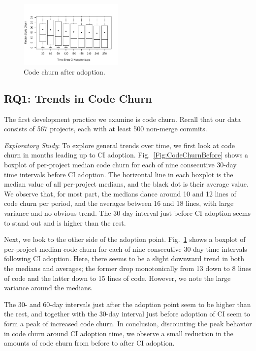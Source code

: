 \begin{figure}[t]
\centering
\includegraphics[width=0.45\textwidth, clip=true, trim=0 15 15 50]{churn_after.pdf}
\caption{Code churn after \Tvis adoption.}
\label{Fig:CodeChurnAfter}\vspace{-0.3cm}
\end{figure}


\subsection{RQ1: Trends in Code Churn}

The first development practice we examine is code churn.
Recall that our data consists of 567 projects, each with at least 500 non-merge 
commits.

\smallskip\noindent \emph{Exploratory Study}: To explore general trends over 
time, we first look at code churn in months leading up to CI adoption.
Fig.~\ref{Fig:CodeChurnBefore} shows a boxplot of per-project median code 
churn for each of nine consecutive 30-day time intervals before CI adoption.
The horizontal line in each boxplot is the median value of all per-project medians, 
and the black dot is their average value.
We observe that, for most part, the medians dance around 10 and 12 lines of 
code churn per period, and the averages between 16 and 18 lines, with large 
variance and no obvious trend. 
The 30-day interval just before CI adoption seems to stand out and is higher 
than the rest.

Next, we look to the other side of the adoption point. 
Fig.~\ref{Fig:CodeChurnAfter} shows a boxplot of per-project median code 
churn for each of nine consecutive 30-day time intervals following CI adoption.
Here, there seems to be a slight downward trend in both the medians and 
averages; the former drop monotonically from 13 down to 8 lines of code and 
the latter down to 15 lines of code.
However, we note the large variance around the medians.

The 30- and 60-day intervals just after the adoption point seem to be higher 
than the rest, and together with the 30-day interval just before adoption of CI 
seem to form a peak of increased code churn.
In conclusion, discounting the peak behavior in code churn around CI adoption 
time, we observe a small reduction in the amounts of code churn from before 
to after CI adoption.

